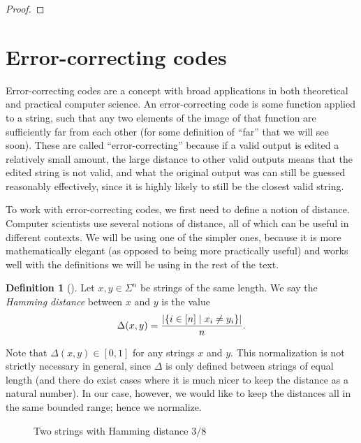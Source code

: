 \documentclass[english,12pt]{reedthesis}
\theoremstyle{plain}
\theoremstyle{definition}
\newtheorem{defn}[defn]{Definition}
\theoremstyle{remark}
\DeclarePairedDelimiter{\abs}{\lvert}{\rvert}
\begin{document}
\begin{proof}
\end{proof}

\section{Error-correcting codes}

Error-correcting codes are a concept with broad applications in both theoretical
and practical computer science. An error-correcting code is some function
applied to a string, such that any two elements of the image of that function
are sufficiently far from each other (for some definition of ``far'' that we
will see soon). These are called ``error-correcting'' because if a valid output
is edited a relatively small amount, the large distance to other valid outputs
means that the edited string is not valid, and what the original output was can
still be guessed reasonably effectively, since it is highly likely to still be
the closest valid string.

To work with error-correcting codes, we first need to define a notion of
distance. Computer scientists use several notions of distance, all of which can
be useful in different contexts. We will be using one of the simpler ones,
because it is more mathematically elegant (as opposed to being more practically
useful) and works well with the definitions we will be using in the rest of the
text.

\begin{defn}[{\cite{Ham50}}]\label{def:hamming-dist}
  Let $x, y \in \Sigma^{n}$ be strings of the same length. We say the \emph{Hamming
    distance} between $x$ and $y$ is the value
  \[
    \Delta(x, y) = \frac{\abs{\{i \in [n] \mid x_{i} \ne y_{i}\}}}{n}.
  \]
\end{defn}

Note that $\Delta(x, y) \in [0, 1]$ for any strings $x$ and $y$. This normalization is
not strictly necessary in general, since $\Delta$ is only defined between strings of
equal length (and there do exist cases where it is much nicer to keep the
distance as a natural number). In our case, however, we would like to keep the
distances all in the same bounded range; hence we normalize.

\begin{figure}[htbp]
  \centering
  \caption{Two strings with Hamming distance $3/8$}\label{fig:hamming-dist}
\end{figure}
\end{document}
